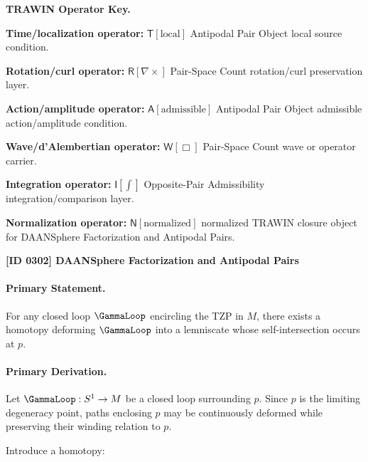 \par\vspace{0.45\baselineskip}
\noindent\begin{minipage}[t]{\linewidth}
\begingroup
\small
\raggedright
\textbf{TRAWIN Operator Key.}\par
\noindent\textbf{Time/localization operator:} $\mathsf{T}\!\left[\mathrm{local}\right]$ Antipodal Pair Object local source condition.\par
\noindent\textbf{Rotation/curl operator:} $\mathsf{R}\!\left[\nabla\times\right]$ Pair-Space Count rotation/curl preservation layer.\par
\noindent\textbf{Action/amplitude operator:} $\mathsf{A}\!\left[\mathrm{admissible}\right]$ Antipodal Pair Object admissible action/amplitude condition.\par
\noindent\textbf{Wave/d'Alembertian operator:} $\mathsf{W}\!\left[\Box\right]$ Pair-Space Count wave or operator carrier.\par
\noindent\textbf{Integration operator:} $\mathsf{I}\!\left[\int\right]$ Opposite-Pair Admissibility integration/comparison layer.\par
\noindent\textbf{Normalization operator:} $\mathsf{N}\!\left[\mathrm{normalized}\right]$ normalized TRAWIN closure object for DAANSphere Factorization and Antipodal Pairs.\par
\endgroup
\end{minipage}

\clearpage
\noindent\textbf{[ID 0302] DAANSphere Factorization and Antipodal Pairs}\par
\vspace{0.35em}
\paragraph{Primary Statement.}
For any closed loop $\GammaLoop$ encircling the TZP in $M$, there exists a homotopy deforming $\GammaLoop$ into a lemniscate whose self-intersection occurs at $p$.

\paragraph{Primary Derivation.}
Let $\GammaLoop:S^1\to M$ be a closed loop surrounding $p$. Since $p$ is the limiting degeneracy point, paths enclosing $p$ may be continuously deformed while preserving their winding relation to $p$.

Introduce a homotopy:

